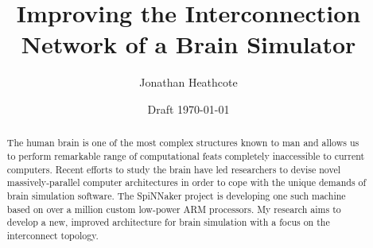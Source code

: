 \documentclass[a4paper,12pt,titlepage]{report}
\title{Improving the Interconnection Network of a Brain Simulator}
\author{Jonathan Heathcote}
\date{Draft \today}
\begin{document}
	
	\maketitle
	
	\begin{abstract}
		
		The human brain is one of the most complex structures known to man and
		allows us to perform remarkable range of computational feats completely
		inaccessible to current computers. Recent efforts to study the brain have
		led researchers to devise novel massively-parallel computer architectures in
		order to cope with the unique demands of brain simulation software. The
		SpiNNaker project is developing one such machine based on over a million
		custom low-power ARM processors. My research aims to develop a new, improved
		architecture for brain simulation with a focus on the interconnect topology.
		
	\end{abstract}
	
	\tableofcontents
	\listoffigures
	
	
	
	
	
	
	
	
	
	
\end{document}
